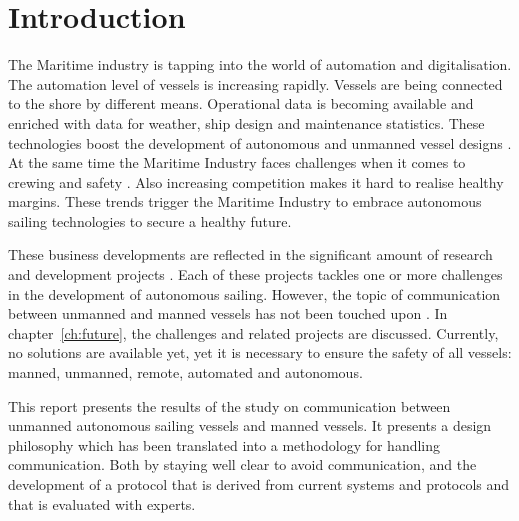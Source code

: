 \chapter*{Introduction}
\label{sec:introduction}

The Maritime industry is tapping into the world of automation and digitalisation. The automation level of vessels is increasing rapidly. Vessels are being connected to the shore by different means. Operational data is becoming available and enriched with data for weather, ship design and maintenance statistics. These technologies boost the development of autonomous and unmanned vessel designs \cite{Blanke2017}. 
At the same time the Maritime Industry faces challenges when it comes to crewing and safety \cite{Cappelle2018}. Also increasing competition makes it hard to realise healthy margins. These trends trigger the Maritime Industry to embrace autonomous sailing technologies to secure a healthy future. 

These business developments are reflected in the significant amount of research and development projects \cite{SMASH2017} \cite{Eriksen2017} \cite{MUNIN2016} \cite{Sames2017} \cite{RollsRoyce2015} \cite{Waterborne2016}. Each of these projects tackles one or more challenges in the development of autonomous sailing. However, the topic of communication between unmanned and manned vessels has not been touched upon \cite{Saarni2018}. In chapter~\ref{ch:future}, the challenges and related projects are discussed. Currently, no solutions are available yet, yet it is necessary to ensure the safety of all vessels: manned, unmanned, remote, automated and autonomous.

This report presents the results of the study on communication between unmanned autonomous sailing vessels and manned vessels. It presents a design philosophy which has been translated into a methodology for handling communication. Both by staying well clear to avoid communication, and the development of a protocol that is derived from current systems and protocols and that is evaluated with experts.

